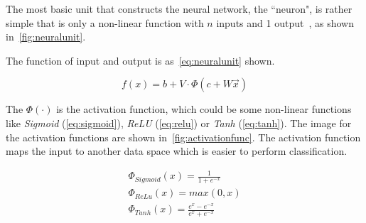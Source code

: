 \begin{spacing}{1.5}
The most basic unit that constructs the neural network, the ``neuron", is rather simple that is only a non-linear function with $n$ inputs and 1 output~\cite{bengio2017deep}, as shown in~\autoref{fig:neuralunit}. 

The function of input and output is as~\autoref{eq:neuralunit} shown. 

\begin{equation}
\label{eq:neuralunit}
    f(x)=b+V \cdot \Phi (c+W \vec{x})
\end{equation}

The $\Phi (\cdot)$ is the activation function, which could be some non-linear functions like \textit{Sigmoid} (\autoref{eq:sigmoid}), \textit{ReLU} (\autoref{eq:relu}) or \textit{Tanh} (\autoref{eq:tanh}). The image for the activation functions are shown in~\autoref{fig:activationfunc}. The activation function maps the input to another data space which is easier to perform classification. 



\begin{gather}
   \Phi_{Sigmoid}(x)=\frac{1}{1+e^{-x}} \label{eq:sigmoid}\\
   \Phi_{ReLu}(x)=max(0,x) \label{eq:relu}\\
   \Phi_{Tanh}(x)=\frac{e^{x}-e^{-x}}{e^{x}+e^{-x}} \label{eq:tanh}
\end{gather}


\end{spacing}
